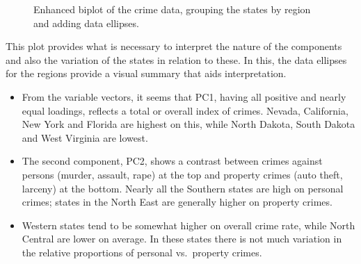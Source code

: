 \documentclass[
  letterpaper,
  10pt,
  krantz2]{krantz}
\begin{document}
{\begin{figure}[H]


\caption{\label{fig-crime-biplot2}Enhanced biplot of the crime data,
grouping the states by region and adding data ellipses.}

\end{figure}%

This plot provides what is necessary to interpret the nature of the
components and also the variation of the states in relation to these. In
this, the data ellipses for the regions provide a visual summary that
aids interpretation.

\begin{itemize}
\item
  From the variable vectors, it seems that PC1, having all positive and
  nearly equal loadings, reflects a total or overall index of crimes.
  Nevada, California, New York and Florida are highest on this, while
  North Dakota, South Dakota and West Virginia are lowest.
\item
  The second component, PC2, shows a contrast between crimes against
  persons (murder, assault, rape) at the top and property crimes (auto
  theft, larceny) at the bottom. Nearly all the Southern states are high
  on personal crimes; states in the North East are generally higher on
  property crimes.
\item
  Western states tend to be somewhat higher on overall crime rate, while
  North Central are lower on average. In these states there is not much
  variation in the relative proportions of personal vs.~property crimes.
\end{itemize}

}
\end{document}
